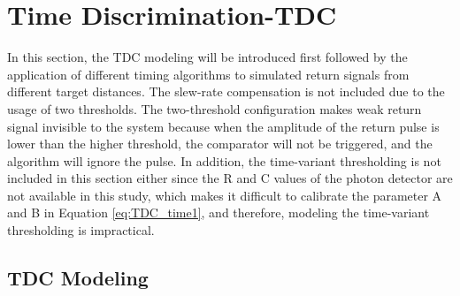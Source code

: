 \chapter{Time Discrimination-TDC}\label{ch:TDC}
In this section, the TDC modeling will be introduced first followed by the application of different timing algorithms to simulated return signals from different target distances. The slew-rate compensation is not included due to the usage of two thresholds. The two-threshold configuration makes weak return signal invisible to the system because when the amplitude of the return pulse is lower than the higher threshold, the comparator will not be triggered, and the algorithm will ignore the pulse. In addition, the time-variant thresholding is not included in this section either since the R and C values of the photon detector are not available in this study, which makes it difficult to calibrate the parameter A and B in Equation \eqref{eq:TDC_time1}, and therefore, modeling the time-variant thresholding is impractical.
\section{TDC Modeling}
